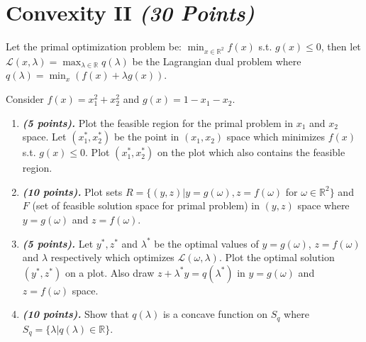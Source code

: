 \documentclass[a4paper]{article}
\begin{document}
\section{Convexity II \textit{(30 Points)}}
Let the primal optimization problem be: $\min_{x \in \mathbb{R}^2} f(x)$ s.t. $g(x)\leq 0$, then let $\mathcal{L}(x,\lambda) = \max_{\lambda\in\mathbb{R}} q(\lambda)$ be the Lagrangian dual problem where $q(\lambda) = \min_{x} ( f(x) + \lambda g(x) )$. 

Consider $f(x) = x_1^2 + x_2^2$ and $g(x) = 1 - x_1 - x_2$.
\begin{enumerate}
    \item \textbf{\textit{(5 points).}} Plot the feasible region for the primal problem in $x_1$ and $x_2$ space. Let $(x^*_1,x^*_2)$ be the point in $(x_1,x_2)$ space which minimizes $f(x)$ s.t. $g(x )\leq0$. Plot $(x^*_1,x^*_2)$ on the plot which also contains the feasible region. 
    \item \textbf{\textit{(10 points).}} Plot sets $R = \{(y,z)|y=g(\omega),z=f(\omega)$ for $\omega \in \mathbb{R}^2\}$ and $F$ (set of feasible solution space for primal problem) in $(y,z)$ space where $y=g(\omega)$ and $z=f(\omega)$.
    \item \textbf{\textit{(5 points).}} Let $y^*, z^*$ and $\lambda^*$ be the optimal values of $y=g(\omega)$, $z=f(\omega)$ and $\lambda$ respectively which optimizes $\mathcal{L}(\omega,\lambda)$. Plot the optimal solution $(y^*,z^*)$ on a plot. Also draw $ z + \lambda^* y = q(\lambda^*)$ in $y=g(\omega)$ and $z=f(\omega)$ space. 
    \item \textbf{\textit{(10 points).}} Show that $q(\lambda)$ is a concave function on $S_q$ where $S_q = \{ \lambda | q(\lambda) \in \mathbb{R} \}$.
\end{enumerate}
\pagebreak
\end{document}

